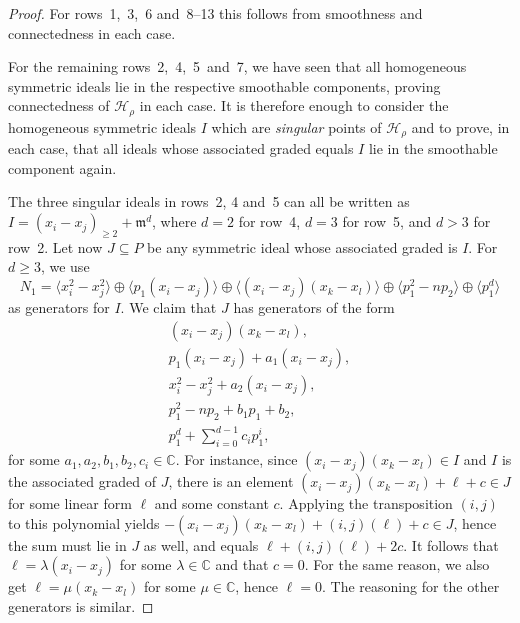 \documentclass[11pt]{amsart}
\theoremstyle{definition}
\newcommand{\CC}{\mathbb{C}}
\newcommand{\mm}{\mathfrak{m}}
\newcommand{\HH}{\mathcal{H}}
\begin{document}
\begin{proof}
For rows~1,~3,~6 and~8--13 this follows from smoothness and connectedness in each case.

For the remaining rows~2,~4,~5~and~7, we have seen that all homogeneous symmetric ideals lie in the respective smoothable components, proving connectedness of $\HH_\rho$ in each case. It is therefore enough to consider the homogeneous symmetric ideals $I$ which are \emph{singular} points of $\HH_\rho$ and to prove, in each case, that all ideals whose associated graded equals $I$ lie in the smoothable component again.

The three singular ideals in rows~2, 4 and~5 can all be written as $I = (x_i-x_j)_{\geq 2} + \mm^d$, where $d=2$ for row~4, $d=3$ for row~5, and $d>3$ for row~2.
Let now $J \subseteq P$ be any symmetric ideal whose associated graded is $I$. For $d \geq 3$, we use
\begin{equation*}
    N_1 = \langle x_i^2 - x_j^2 \rangle \oplus \langle p_1(x_i - x_j)  \rangle \oplus \langle (x_i - x_j)(x_k - x_l) \rangle \oplus \langle p_1^2 - n p_2 \rangle \oplus \langle p_1^d \rangle
\end{equation*}
as generators for $I$. We claim that $J$ has generators of the form
\begin{gather*}
    (x_i - x_j)(x_k - x_l), \\
    p_1(x_i - x_j) + a_1(x_i - x_j), \\
    x_i^2 - x_j^2 + a_2(x_i - x_j), \\
    p_1^2 - np_2 + b_1 p_1 + b_2, \\
    p_1^d + \sum_{i=0}^{d-1} c_i p_1^i,
\end{gather*}
for some $a_1,a_2,b_1,b_2,c_i \in \CC$. For instance, since $(x_i - x_j)(x_k - x_l) \in I$ and $I$ is the associated graded of $J$, there is an element $(x_i - x_j)(x_k - x_l) + \ell + c \in J$ for some linear form $\ell$ and some constant $c$. Applying the transposition $(i,j)$ to this polynomial yields $-(x_i - x_j)(x_k - x_l) + (i,j)(\ell) + c \in J$, hence the sum must lie in $J$ as well, and equals $\ell + (i,j)(\ell) + 2c$. It follows that $\ell = \lambda (x_i - x_j)$ for some $\lambda \in \CC$ and that $c = 0$. For the same reason, we also get $\ell = \mu (x_k - x_l)$ for some $\mu \in \CC$, hence $\ell = 0$. The reasoning for the other generators is similar.


\end{proof}
\end{document}
